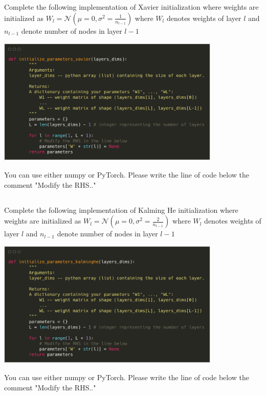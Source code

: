 \begin{frame}
\section{}
Complete the following implementation of Xavier initialization where weights are initialized as $W_l = \mathcal{N}(\mu=0,\sigma^2=\frac 1 {n_{l-1}})$ where $W_l$ denotes weights of layer $l$ and $n_{l-1}$ denote number of nodes in layer $l-1$

\includegraphics[width=0.8\textwidth]{images/quiz_4_4_1_1.png}

You can use either numpy or PyTorch. Please write the line of code below the comment "Modify the RHS.."



\end{frame}

\begin{frame}
\section{}
Complete the following implementation of Kalming He initialization where weights are initialized as $W_l = \mathcal{N}(\mu=0,\sigma^2=\frac 2 {n_{l-1}})$ where $W_l$ denotes weights of layer $l$ and $n_{l-1}$ denote number of nodes in layer $l-1$

\includegraphics[width=0.8\textwidth]{images/quiz_4_4_1_2.png}

You can use either numpy or PyTorch. Please write the line of code below the comment "Modify the RHS.."



\end{frame}
